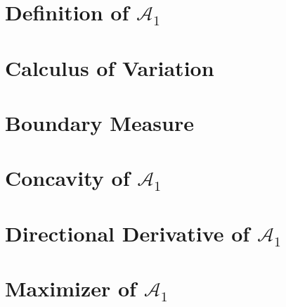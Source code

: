 
\section{Definition of $\mathcal{A}_1$}
\label{sec:definition-of-a1}


\section{Calculus of Variation}
\label{sec:calculus-of-variation}


\section{Boundary Measure}
\label{sec:boundary-measure}


\section{Concavity of $\mathcal{A}_1$}
\label{sec:concavity-of-a1}


\section{Directional Derivative of $\mathcal{A}_1$}
\label{sec:directional-derivative-of-a1}


\section{Maximizer of $\mathcal{A}_1$}
\label{sec:maximizer-of-a1}


